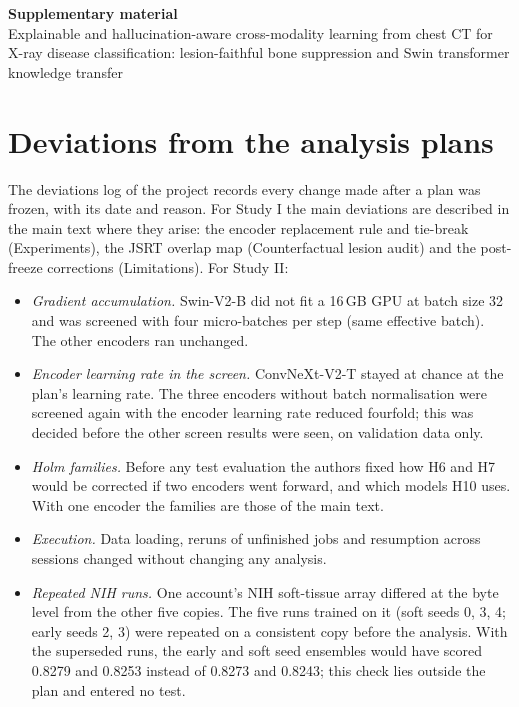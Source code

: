 \documentclass[preprint,12pt,authoryear]{elsarticle}
\begin{document}
\begin{center}
{\Large\bfseries Supplementary material}\\[0.6em]
{\large Explainable and hallucination-aware cross-modality learning from chest CT for X-ray disease classification: lesion-faithful bone
suppression and Swin transformer knowledge transfer}
\end{center}

\section{Deviations from the analysis plans}
\label{sup:dev}
The deviations log of the project records every change made after a plan was frozen, with its date and reason. For Study I the main
deviations are described in the main text where they arise: the encoder replacement rule and tie-break (Experiments), the JSRT overlap map
(Counterfactual lesion audit) and the post-freeze corrections (Limitations). For Study II:
\begin{itemize}
\item \emph{Gradient accumulation.} Swin-V2-B did not fit a 16\,GB GPU at batch size 32 and was screened with four micro-batches per step
  (same effective batch). The other encoders ran unchanged.
\item \emph{Encoder learning rate in the screen.} ConvNeXt-V2-T stayed at chance at the plan's learning rate. The three encoders without
  batch normalisation were screened again with the encoder learning rate reduced fourfold; this was decided before the other screen results
  were seen, on validation data only.
\item \emph{Holm families.} Before any test evaluation the authors fixed how H6 and H7 would be corrected if two encoders went forward, and
  which models H10 uses. With one encoder the families are those of the main text.
\item \emph{Execution.} Data loading, reruns of unfinished jobs and resumption across sessions changed without changing any analysis.
\item \emph{Repeated NIH runs.} One account's NIH soft-tissue array differed at the byte level from the other five copies. The five runs
  trained on it (soft seeds 0, 3, 4; early seeds 2, 3) were repeated on a consistent copy before the analysis. With the superseded runs,
  the early and soft seed ensembles would have scored 0.8279 and 0.8253 instead of 0.8273 and 0.8243; this check lies outside the plan and
  entered no test.
\end{itemize}
\end{document}
